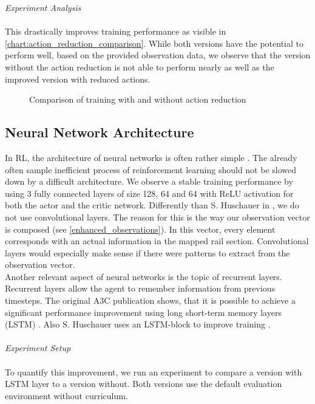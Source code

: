 \textit{Experiment Analysis}\\\\
This drastically improves training performance as visible in \autoref{chart:action_reduction_comparison}. While both versions have the potential to perform well, based on the provided observation data, we observe that the version without the action reduction is not able to perform nearly as well as the improved version with reduced actions.
\begin{figure}[H]
	\begin{center}
		
	\end{center}
	\caption{Comparison of training with and without action reduction}
	\label{chart:action_reduction_comparison}
\end{figure}
\subsection*{Neural Network Architecture}\label{network_architecture}
In RL, the architecture of neural networks is often rather simple \cite{mnih2013playing,a3c}. The already often sample inefficient process of reinforcement learning should not be slowed down by a difficult architecture. We observe a stable training performance by using 3 fully connected layers of size 128, 64 and 64 with ReLU activation for both the actor and the critic network. Differently than S. Huschauer in \cite{flatlandstephan}, we do not use convolutional layers. The reason for this is the way our observation vector is composed (see \autoref{enhanced_observations}). In this vector, every element corresponds with an actual information in the mapped rail section. Convolutional layers would especially make sense if there were patterns to extract from the observation vector.\\
Another relevant aspect of neural networks is the topic of recurrent layers. Recurrent layers allow the agent to remember information from previous timesteps. The original A3C publication shows, that it is possible to achieve a significant performance improvement using long short-term memory layers (LSTM) \cite{a3c}. Also S. Huschauer uses an LSTM-block to improve training \cite{flatlandstephan}.\\\\
\textit{Experiment Setup}\\\\
To quantify this improvement, we run an experiment to compare a version with LSTM layer to a version without. Both versions use the default evaluation environment without curriculum.
